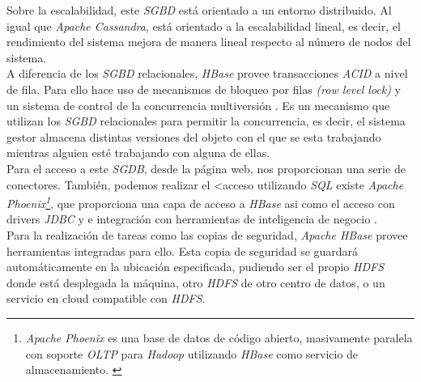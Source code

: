 \documentclass{article}
\begin{document}
Sobre la escalabilidad, este \emph{SGBD} está orientado a un entorno distribuido. Al igual que \emph{Apache Cassandra}, está orientado a la escalabilidad lineal, es decir, el rendimiento del sistema mejora de manera lineal respecto al número de nodos del sistema. \cite{AP:7} \\

A diferencia de los \emph{SGBD} relacionales, \emph{HBase} provee transacciones \emph{ACID} a nivel de fila. Para ello hace uso de mecanismos de bloqueo por filas \emph{(row level lock)} y un sistema de control de la concurrencia multiversión \cite{BAP:1}\cite{QL:1}. Es un mecanismo que utilizan los \emph{SGBD} relacionales para permitir la concurrencia, es decir, el sistema gestor almacena distintas versiones del objeto con el que se esta trabajando mientras alguien esté trabajando con alguna de ellas. \cite{WIKI:12} \\

Para el acceso a este \emph{SGDB}, desde la página web, nos proporcionan una serie de conectores. También, podemos realizar el <acceso utilizando \emph{SQL} existe \emph{Apache Phoenix\footnote{\emph{Apache Phoenix} es una base de datos de código abierto, masivamente paralela con soporte \emph{OLTP} para \emph{Hadoop} utilizando \emph{HBase} como servicio de almacenamiento. \cite{WIKI:11}}}, que proporciona una capa de acceso a \emph{HBase} asi como el acceso con drivers \emph{JDBC} y e integración con herramientas de inteligencia de negocio \cite{WIKI:8}. \\
Para la realización de tareas como las copias de seguridad, \emph{Apache HBase} provee herramientas integradas para ello. Esta copia de seguridad se guardará automáticamente en la ubicación especificada, pudiendo ser el propio \emph{HDFS} donde está desplegada la máquina, otro \emph{HDFS} de otro centro de datos, o un servicio en cloud compatible con \emph{HDFS}. \cite{AP:8}\\

\newpage


 
\end{document}
